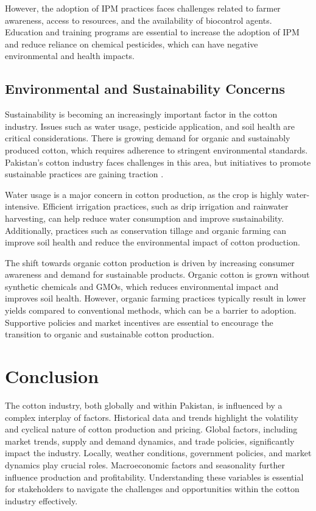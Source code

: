 \documentclass[12pt]{article}
\begin{document}
However, the adoption of IPM practices faces challenges related to farmer awareness, access to resources, and the availability of biocontrol agents. Education and training programs are essential to increase the adoption of IPM and reduce reliance on chemical pesticides, which can have negative environmental and health impacts.

\subsection{Environmental and Sustainability Concerns}

Sustainability is becoming an increasingly important factor in the cotton industry. Issues such as water usage, pesticide application, and soil health are critical considerations. There is growing demand for organic and sustainably produced cotton, which requires adherence to stringent environmental standards. Pakistan's cotton industry faces challenges in this area, but initiatives to promote sustainable practices are gaining traction \cite{usda2022, usda2021}.

Water usage is a major concern in cotton production, as the crop is highly water-intensive. Efficient irrigation practices, such as drip irrigation and rainwater harvesting, can help reduce water consumption and improve sustainability. Additionally, practices such as conservation tillage and organic farming can improve soil health and reduce the environmental impact of cotton production.

The shift towards organic cotton production is driven by increasing consumer awareness and demand for sustainable products. Organic cotton is grown without synthetic chemicals and GMOs, which reduces environmental impact and improves soil health. However, organic farming practices typically result in lower yields compared to conventional methods, which can be a barrier to adoption. Supportive policies and market incentives are essential to encourage the transition to organic and sustainable cotton production.

\section{Conclusion}

The cotton industry, both globally and within Pakistan, is influenced by a complex interplay of factors. Historical data and trends highlight the volatility and cyclical nature of cotton production and pricing. Global factors, including market trends, supply and demand dynamics, and trade policies, significantly impact the industry. Locally, weather conditions, government policies, and market dynamics play crucial roles. Macroeconomic factors and seasonality further influence production and profitability. Understanding these variables is essential for stakeholders to navigate the challenges and opportunities within the cotton industry effectively.
\end{document}
